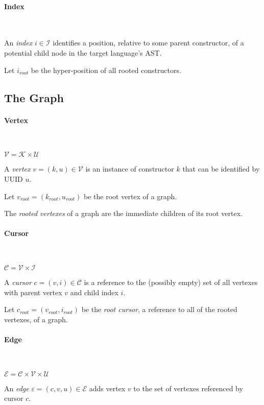 \documentclass[letterpaper,12pt]{report}
\def\C{\mathcal{C}}
\def\E{\mathcal{E}}
\def\I{\mathcal{I}}
\def\K{\mathcal{K}}
\def\U{\mathcal{U}}
\def\V{\mathcal{V}}
\def\e{\varepsilon}
\begin{document}
\paragraph{Index} ~

An \emph{index} $i \in \I$ identifies a position, relative to some parent
constructor, of a potential child node in the target language's AST.

Let $i_{root}$ be the hyper-position of all rooted constructors.


\subsection{The Graph}
\label{sec:concepts:the-graph}

\paragraph{Vertex} ~

$\V = \K \times \U$

A \emph{vertex} $v = (k, u) \in \V$ is an instance of constructor $k$ that can
be identified by UUID $u$.

Let $v_{root} = (k_{root}, u_{root})$ be the root vertex of a graph.

The \emph{rooted vertexes} of a graph are the immediate children of its root
vertex.

\paragraph{Cursor} ~

$\C = \V \times \I$

A \emph{cursor} $c = (v,i) \in \C$ is a reference to the (possibly empty) set
of all vertexes with parent vertex $v$ and child index $i$.

Let $c_{root} = (v_{root}, i_{root})$ be the \emph{root cursor}, a reference
to all of the rooted vertexes, of a graph.

\paragraph{Edge} ~

$\E = \C \times \V \times \U$

An \emph{edge} $\e = (c, v, u) \in \E$ adds vertex $v$ to the set of vertexes
referenced by cursor $c$.
\end{document}
